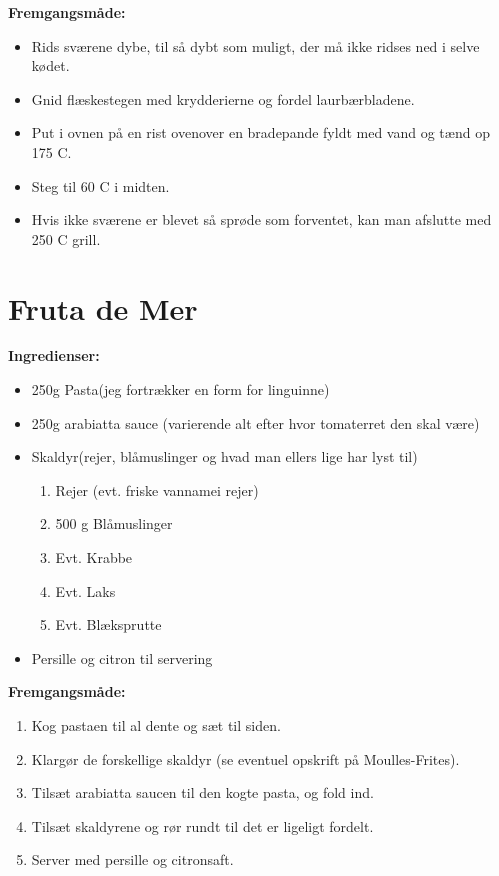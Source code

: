 \documentclass{book}
\begin{document}
\begin{minipage}[t]{0.5\textwidth}
\textbf{Fremgangsmåde:}
\begin{itemize}
    \item Rids sværene dybe, til så dybt som muligt, der må ikke ridses ned i selve kødet.
    \item Gnid flæskestegen med krydderierne og fordel laurbærbladene.
    \item Put i ovnen på en rist ovenover en bradepande fyldt med vand og tænd op 175 \degree C. 
    \item Steg til 60 \degree C i midten.
    \item Hvis ikke sværene er blevet så sprøde som forventet, kan man afslutte med 250 \degree C grill.
\end{itemize}
\end{minipage}
\newpage  {}
\newpage \section{Fruta de Mer}
\begin{minipage}[t]{0.5\textwidth}
\textbf{Ingredienser:}
\begin{itemize}
    \item 250g Pasta(jeg fortrækker en form for linguinne)
    \item 250g arabiatta sauce (varierende alt efter hvor tomaterret den skal være)
    \item Skaldyr(rejer, blåmuslinger og hvad man ellers lige har lyst til)
    \begin{enumerate}
        \item Rejer (evt. friske vannamei rejer)
        \item 500 g Blåmuslinger
        \item Evt. Krabbe
        \item Evt. Laks
        \item Evt. Blæksprutte
    \end{enumerate}
    \item Persille og citron til servering
\end{itemize}
\end{minipage}
\begin{minipage}[t]{0.5\textwidth}
\textbf{Fremgangsmåde:}
\begin{enumerate}
    \item Kog pastaen til al dente og sæt til siden.
    \item Klargør de forskellige skaldyr (se eventuel opskrift på Moulles-Frites).
    \item Tilsæt arabiatta saucen til den kogte pasta, og fold ind.
    \item Tilsæt skaldyrene og rør rundt til det er ligeligt fordelt.
    \item Server med persille og citronsaft.
\end{enumerate}
\end{minipage}
\end{document}
